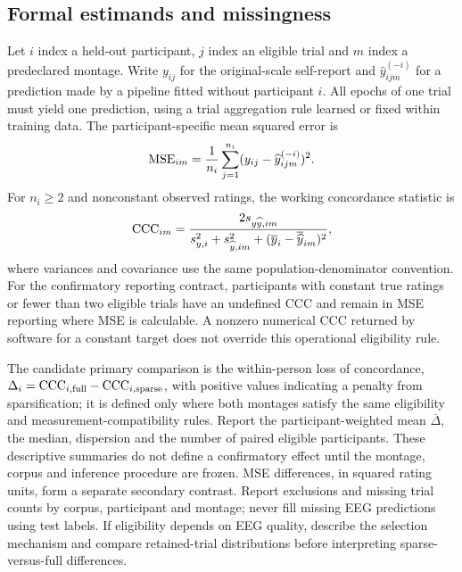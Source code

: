 \subsection{Formal estimands and missingness}
Let $i$ index a held-out participant, $j$ index an eligible trial and $m$ index a
predeclared montage. Write $y_{ij}$ for the original-scale self-report and
$\widehat y_{ijm}^{(-i)}$ for a prediction made by a pipeline fitted without
participant $i$. All epochs of one trial must yield one prediction, using a
trial aggregation rule learned or fixed within training data. The
participant-specific mean squared error is
\begin{equation}
 {\rm MSE}_{im}=\frac{1}{n_i}\sum_{j=1}^{n_i}
 (y_{ij}-\widehat y_{ijm}^{(-i)})^2.
\end{equation}
For $n_i\geq2$ and nonconstant observed ratings, the working concordance
statistic is
\begin{equation}
 {\rm CCC}_{im}=
 \frac{2s_{y\widehat y,im}}
 {s^2_{y,i}+s^2_{\widehat y,im}
 +(\overline y_i-\overline{\widehat y}_{im})^2},
\end{equation}
where variances and covariance use the same population-denominator
convention. For the confirmatory reporting contract, participants with
constant true ratings or fewer than two eligible trials have an undefined
CCC and remain in MSE reporting where MSE is calculable. A nonzero numerical
CCC returned by software for a constant target does not override this
operational eligibility rule.

The candidate primary comparison is the within-person loss of concordance,
$\Delta_i={\rm CCC}_{i,\mathrm{full}}-
{\rm CCC}_{i,\mathrm{sparse}}$, with positive values indicating a penalty
from sparsification; it is defined only where both montages satisfy the
same eligibility and measurement-compatibility rules. Report the
participant-weighted mean $\overline\Delta$, the median, dispersion and the
number of paired eligible participants. These descriptive summaries do
not define a confirmatory effect until the montage, corpus and inference
procedure are frozen. MSE differences, in squared rating units, form a
separate secondary contrast. Report exclusions and missing trial counts
by corpus, participant and montage; never fill missing EEG predictions
using test labels. If eligibility depends on EEG quality, describe the
selection mechanism and compare retained-trial distributions before
interpreting sparse-versus-full differences.

